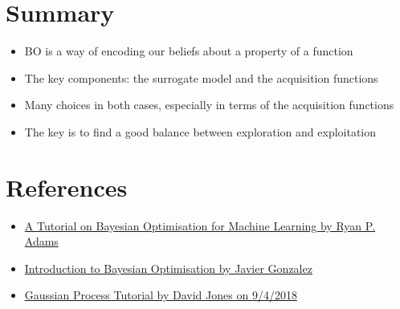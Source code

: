 \documentclass{article}
\theoremstyle{definition}
\begin{document}
\section{Summary}
\begin{itemize}
    \item BO is a way of encoding our beliefs about a property of a function
    \item The key components: the surrogate model and the acquisition functions
    \item Many choices in both cases, especially in terms of the acquisition functions
    \item The key is to find a good balance between exploration and exploitation
\end{itemize}


\section{References}
\begin{itemize}
    \item \href{https://www.iro.umontreal.ca/~bengioy/cifar/NCAP2014-summerschool/slides/Ryan_adams_140814_bayesopt_ncap.pdf}{A Tutorial on Bayesian Optimisation for Machine Learning by Ryan P. Adams}
    \item \href{http://gpss.cc/gpmc17/slides/LancasterMasterclass_1.pdf}{Introduction to Bayesian Optimisation by Javier Gonzalez}
    \item \href{http://web.mit.edu/iachec/meetings/2018/presentations/Jones_SessionIII.pdf}{Gaussian Process Tutorial by David Jones on 9/4/2018}
\end{itemize}
\end{document}

